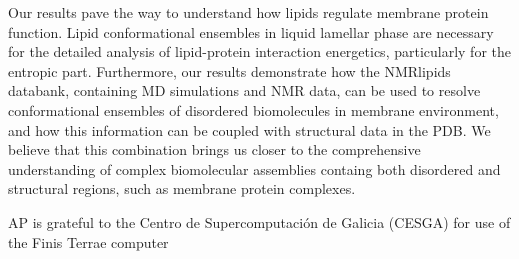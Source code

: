 \documentclass[aps,prl,superscriptaddress,twocolumn]{revtex4}
\begin{document}
Our results pave the way to understand how lipids regulate membrane protein function.
Lipid conformational ensembles in liquid lamellar phase are necessary
for the detailed analysis of lipid-protein interaction energetics,
particularly for the entropic part. 
Furthermore, our results demonstrate how the NMRlipids databank, containing MD simulations and NMR data,
can be used to resolve
conformational ensembles of disordered biomolecules in membrane environment,
and how this information can be coupled with structural data in the PDB.
We believe that this combination brings us closer to the comprehensive understanding of
complex biomolecular assemblies containg both disordered and structural regions, such as membrane
protein complexes.



%

\begin{acknowledgments}
AP is grateful to the Centro de
Supercomputación de Galicia (CESGA) for use of the Finis
Terrae computer
\end{acknowledgments}
\end{document}
